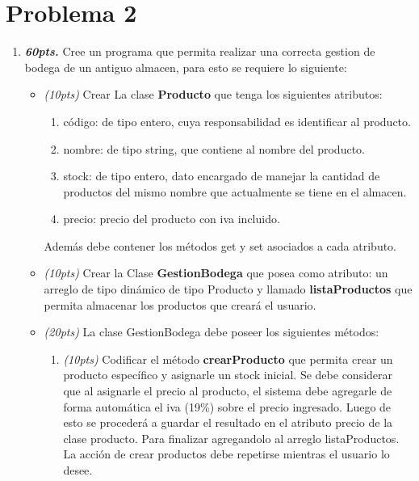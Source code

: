 \documentclass{exam}
\begin{document}
\newpage
\vspace{-7mm}
\section{\textbf{Problema 2}}
\noindent

\begin{questions}

  \begin{enumerate}
    \item \textbf{\emph{60pts.}} Cree un programa que permita realizar una correcta gestion de bodega de un antiguo almacen, para esto se requiere  lo siguiente:
    \begin{itemize}

    \item \emph{(10pts)} Crear La clase  \textbf{Producto} que tenga los siguientes atributos:
      \begin{enumerate}
        \item c\'odigo: de tipo entero, cuya responsabilidad es identificar al producto.
    	  \item nombre: de tipo string, que contiene al nombre del producto.
    	  \item stock: de tipo entero, dato encargado de manejar la cantidad de productos del mismo nombre que actualmente se tiene en el almacen.
    	  \item precio: precio del producto con iva incluido.
    \end{enumerate}
    Adem\'as debe contener los m\'etodos get y set asociados a cada atributo.

    \item \emph{(10pts)} Crear la Clase \textbf{GestionBodega} que posea como atributo:
     un arreglo de tipo dinámico de tipo Producto y llamado \textbf{listaProductos} que permita almacenar los productos que crear\'a el usuario.

    \item \emph{(20pts)} La clase GestionBodega debe poseer los siguientes m\'etodos:
    \begin{enumerate}

      \item \emph{(10pts)} Codificar el m\'etodo \textbf{crearProducto} que permita crear un  producto específico y asignarle un stock inicial.
      Se debe considerar que al asignarle el precio al producto, el sistema debe agregarle  de forma automática el iva (19\%) sobre el precio ingresado.
      Luego de esto se procederá a guardar el resultado en el atributo precio de la clase producto. Para finalizar agregandolo al arreglo listaProductos.
      La acci\'on de crear productos debe repetirse mientras el usuario lo desee.


\end{enumerate}
\end{itemize}
\end{enumerate}
\end{questions}
\end{document}
